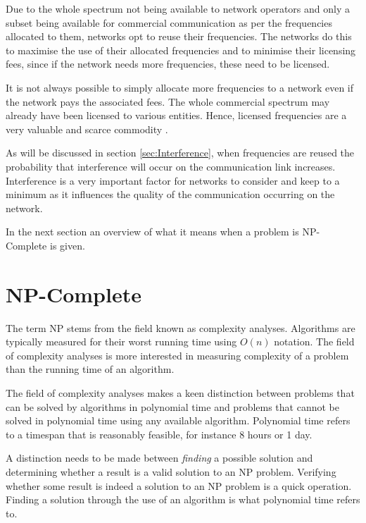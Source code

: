 Due to the whole spectrum not being available to network operators and only a subset being available for commercial communication as per the frequencies allocated to them, networks opt to reuse their frequencies\cite{FAPInCell}. The networks do this to maximise the use of their allocated frequencies and to minimise their licensing fees, since if the network needs more frequencies, these need to be licensed\cite{FAPRAMColouring}.

It is not always possible to simply allocate more frequencies to a network even if the network pays the associated fees. The whole commercial spectrum may already have been licensed to various entities. Hence, licensed frequencies are a very valuable and scarce commodity \cite{FAPRAMColouring,FAPInCell,Eisenblatter,Karen2004}.

As will be discussed in section \ref{sec:Interference}, when frequencies are reused the probability that interference will occur on the communication link increases. Interference is a very important factor for networks to consider and keep to a minimum as it influences the quality of the communication occurring on the network.

In the next section an overview of what it means when a problem is NP-Complete is given.

\section{NP-Complete}
\label{sec:NPComplete}
The term NP stems from the field known as complexity analyses. Algorithms are typically measured for their worst running time using $O(n)$ notation. The field of complexity analyses is more interested in measuring complexity of a problem than the running time of an algorithm\cite{AIModernApproach}.

The field of complexity analyses makes a keen distinction between problems that can be solved by algorithms in polynomial time and problems that cannot be solved in polynomial time using any available algorithm\cite{AIModernApproach}. Polynomial time refers to a timespan that is reasonably feasible, for instance 8 hours or 1 day.

A distinction needs to be made between \emph{finding} a possible solution and determining whether a result is a valid solution to an NP problem. Verifying whether some result is indeed a solution to an NP problem is a quick operation. Finding a solution through the use of an algorithm is what polynomial time refers to.

